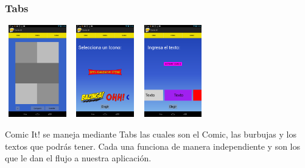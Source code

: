 \documentclass[utf8]{beamer}
\begin{document}
\begin{frame}
  \frametitle{Tabs}
 

  	\begin{center}
		\begingroup
			\includegraphics[height=4cm,width=2.8205cm]{imagenes/plantilla.png}
			\hspace{1mm}
			\includegraphics[height=4cm,width=2.8205cm]{imagenes/iconos.png}
			\hspace{1mm}
			\includegraphics[height=4cm,width=2.8205cm]{imagenes/textos.png}
		\endgroup
	\end{center}

  \begin{block}{}
Comic It! se maneja mediante Tabs las cuales son el Comic, las burbujas y los textos que podrás tener. Cada una funciona de manera independiente y son los que le dan el flujo a nuestra aplicación.
  \end{block}

\end{frame}
\end{document}
